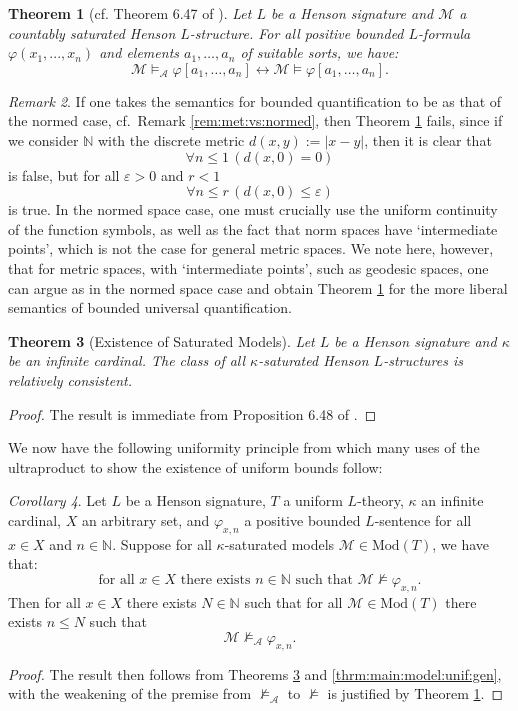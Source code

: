 \documentclass[11pt]{amsart}
\newtheorem{theorem}{Theorem}[section]
\theoremstyle{definition}
\theoremstyle{remark}
\newtheorem{remark}[theorem]{Remark}
\newtheorem{corollary}[theorem]{Corollary}
\def\NN{\mathbb{N}}
\begin{document}
\begin{theorem}[cf. Theorem 6.47 of \cite{DI2017}]
\label{thrm:approx:model}
    Let $L$ be a Henson signature and $\mathcal{M}$ a countably saturated Henson $L$-structure. For all positive bounded $L$-formula $\varphi(x_1, . . . , x_n)$ and elements $a_1,\ldots, a_n$  of suitable sorts, we have:
    \[
    \mathcal{M}\models_{\mathcal{A}} \varphi[a_1,\ldots, a_n] \leftrightarrow \mathcal{M}\models \varphi[a_1,\ldots, a_n].
    \]
\end{theorem}
\begin{remark}
    If one takes the semantics for bounded quantification to be as that of the normed case, cf.\ Remark \ref{rem:met:vs:normed}, then Theorem \ref{thrm:approx:model} fails, since if we consider $\NN$ with the discrete metric $d(x,y):= |x-y|$, then it is clear that 
    \[
    \forall n \le 1\, (d(x,0) =0)
    \]
    is false, but for all $\varepsilon >0$ and $r<1$
    \[
    \forall n \le r\, (d(x,0) \le \varepsilon) 
    \]
    is true. In the normed space case, one must crucially use the uniform continuity of the function symbols, as well as the fact that norm spaces have `intermediate points', which is not the case for general metric spaces. We note here, however, that for metric spaces, with `intermediate points', such as geodesic spaces, one can argue as in the normed space case and obtain Theorem \ref{thrm:approx:model} for the more liberal semantics of bounded universal quantification.
\end{remark}
\begin{theorem}[Existence of Saturated Models]
\label{thrm:exist:sat}
    Let $L$ be a Henson signature and $\kappa$ be an infinite cardinal. The class of all $\kappa$-saturated Henson $L$-structures is relatively consistent.
\end{theorem}
\begin{proof}
    The result is immediate from Proposition 6.48 of \cite{DI2017}.
\end{proof}
We now have the following uniformity principle from which many uses of the ultraproduct to show the existence of uniform bounds follow:
\begin{corollary}
    \label{cor:main:model:unif:sat}
  Let $L$ be a Henson signature, $T$ a uniform $L$-theory, $\kappa$ an infinite cardinal, $X$ an arbitrary set, and $\varphi_{x,n}$ a positive bounded $L$-sentence for all $x \in X$ and $n \in \NN$. Suppose for all $\kappa$-saturated models $\mathcal{M} \in \mathrm{Mod}(T)$, we have that: 
  \[
  \mbox{for all } x \in X \mbox{ there exists } n \in \NN \mbox{ such that }
    \mathcal{M}\nvDash\varphi_{x,n}.
  \]
Then for all $x \in X$ there exists $N \in \NN$ such that for all $\mathcal{M}\in \mathrm{Mod}(T)$ there exists $n \le N$ such that  
\[
\mathcal{M} \nvDash_{\mathcal{A}} \varphi_{x,n}.
\]
\end{corollary}
\begin{proof}
    The result then follows from Theorems \ref{thrm:exist:sat} and \ref{thrm:main:model:unif:gen}, with the weakening of the premise from $\nvDash_{\mathcal{A}}$ to $\nvDash$ is justified by Theorem \ref{thrm:approx:model}. 
\end{proof}
\end{document}

